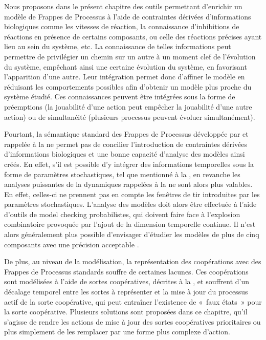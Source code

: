 \myskip

Nous proposons dans le présent chapitre des outils permettant
d'enrichir un modèle de Frappes de Processus à l'aide de
contraintes dérivées d'informations biologiques
comme les vitesses de réaction,
la connaissance d'inhibitions de réactions en présence de certains composants,
ou celle des réactions précises ayant lieu au sein du système, etc.
La connaissance de telles informations peut permettre de privilégier un chemin
sur un autre
à un moment clef de l'évolution du système, empêchant ainsi une certaine évolution du système,
en favorisant l'apparition d'une autre.
Leur intégration permet donc d'affiner le modèle en réduisant les comportements possibles
afin d'obtenir un modèle plus proche du système étudié.
Ces connaissances peuvent être intégrées sous la forme de préemptions (la jouabilité d'une action
peut empêcher la jouabilité d'une autre action) ou de simultanéité
(plusieurs processus peuvent évoluer simultanément).

Pourtant, la sémantique standard des Frappes de Processus
développée par 
et rappelée à la 
ne permet pas de concilier l'introduction de contraintes dérivées d'informations biologiques
et une bonne capacité d'analyse des modèles ainsi créés.
En effet, s'il est possible d'y intégrer des informations temporelles
sous la forme de paramètres stochastiques, tel que mentionné à la ,
en revanche les analyses puissantes de la dynamiques rappelées à la 
ne sont alors plus valables.
En effet, celles-ci ne prennent pas en compte les fenêtres de tir introduites par les
paramètres stochastiques.
L'analyse des modèles doit alors être effectuée à l'aide d'outils de model checking
probabilistes, qui doivent faire face à l'explosion combinatoire provoquée par l'ajout
de la dimension temporelle continue.
Il n'est alors généralement plus possible d'envisager d'étudier
les modèles de plus de cinq composants avec une précision acceptable
\cite[p.~170]{Pauleve11}.

De plus, au niveau de la modélisation, la représentation des coopérations avec des Frappes de
Processus standards souffre de certaines lacunes.
Ces coopérations sont modélisées à l'aide de sortes coopératives, décrites à la ,
et souffrent d'un décalage temporel entre les sortes à représenter et
la mise à jour du processus actif de la sorte coopérative,
qui peut entraîner l'existence de «~faux états~» pour la sorte coopérative.
Plusieurs solutions sont proposées dans ce chapitre, qu'il s'agisse de rendre les actions de mise à
jour des sortes coopératives prioritaires ou plus simplement de les remplacer par une forme plus
complexe d'action.

